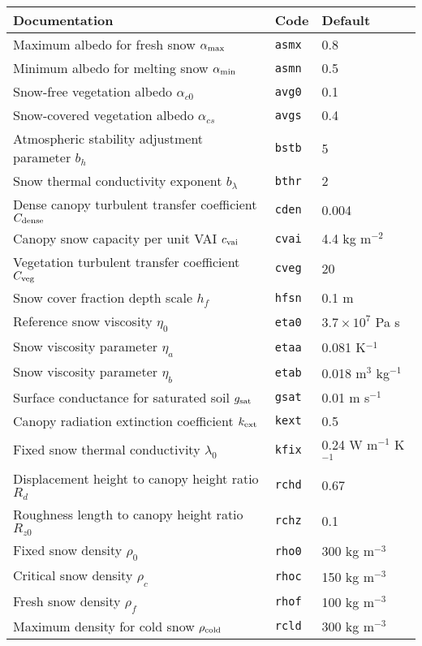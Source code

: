 \documentclass{article}
\begin{document}
\vskip20pt
\begin{tabular}{|l|l|l|}
\hline
Documentation & Code & Default \\
\hline
Maximum albedo for fresh snow $\alpha_{\rm max}$ & {\tt asmx} & 0.8 \\
Minimum albedo for melting snow $\alpha_{\rm min}$ & {\tt asmn} & 0.5 \\
Snow-free vegetation albedo $\alpha_{c0}$ & {\tt avg0} & 0.1 \\
Snow-covered vegetation albedo $\alpha_{cs}$ & {\tt avgs} & 0.4 \\ 
Atmospheric stability adjustment parameter $b_h$ & {\tt bstb} & 5 \\
Snow thermal conductivity exponent $b_\lambda$ & {\tt bthr} & 2 \\
Dense canopy turbulent transfer coefficient $C_{\rm dense}$ & {\tt cden} & 0.004 \\
Canopy snow capacity per unit VAI $c_{\rm vai}$ & {\tt cvai} & 4.4 kg m$^{-2}$ \\
Vegetation turbulent transfer coefficient $C_{\rm veg}$ & {\tt cveg} & 20 \\
Snow cover fraction depth scale $h_f$ & {\tt hfsn} & 0.1 m \\
Reference snow viscosity $\eta_0$ & {\tt eta0} & $3.7 \times 10^7$ Pa s \\
Snow viscosity parameter $\eta_a$ & {\tt etaa} & 0.081 K$^{-1}$ \\
Snow viscosity parameter $\eta_b$ & {\tt etab} & 0.018 m$^3$ kg$^{-1}$ \\
Surface conductance for saturated soil $g_{\rm sat}$ & {\tt gsat} & 0.01 m s$^{-1}$ \\
Canopy radiation extinction coefficient $k_{\rm ext}$ & {\tt kext} &  0.5 \\
Fixed snow thermal conductivity $\lambda_0$ & {\tt kfix} & 0.24 W m$^{-1}$ K$^{-1}$ \\
Displacement height to canopy height ratio $R_d$ & {\tt rchd} & 0.67 \\
Roughness length to canopy height ratio $R_{z0}$ & {\tt rchz} & 0.1 \\
Fixed snow density $\rho_0$ & {\tt rho0} & 300 kg m$^{-3}$ \\
Critical snow density $\rho_c$ & {\tt rhoc} & 150 kg m$^{-3}$ \\
Fresh snow density $\rho_f$ & {\tt rhof} & 100 kg m$^{-3}$ \\
Maximum density for cold snow $\rho_{\rm cold}$ & {\tt rcld} & 300 kg m$^{-3}$ \\

\end{tabular}
\end{document}
